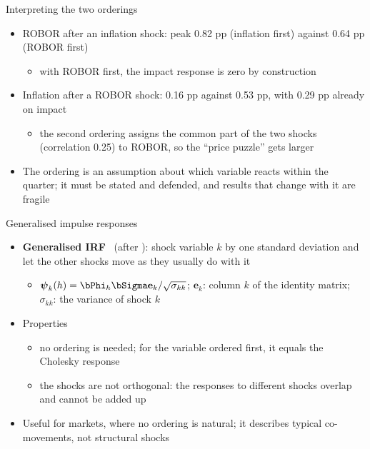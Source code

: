 \begin{frame}{Interpreting the two orderings}
\itemsize{\small}
\begin{itemize}
    \item ROBOR after an inflation shock: peak 0.82 pp (inflation first) against 0.64 pp (ROBOR first)
    \begin{itemize}
        \item with ROBOR first, the impact response is zero by construction
    \end{itemize}
    \item Inflation after a ROBOR shock: 0.16 pp against 0.53 pp, with 0.29 pp already on impact
    \begin{itemize}
        \item the second ordering assigns the common part of the two shocks (correlation 0.25) to ROBOR, so the ``price puzzle'' gets larger
    \end{itemize}
    \item The ordering is an assumption about which variable reacts within the quarter; it must be stated and defended, and results that change with it are fragile
\end{itemize}
\end{frame}

\begin{frame}{Generalised impulse responses}
\itemsize{\small}
\begin{itemize}
    \item \textbf{Generalised IRF} \ (after ): shock variable $k$ by one standard deviation and let the other shocks move as they usually do with it
    \begin{itemize}
        \item $\boldsymbol{\psi}_k(h) = \bPhi_h\bSigma\mathbf{e}_k/\sqrt{\sigma_{kk}}$; $\mathbf{e}_k$: column $k$ of the identity matrix; $\sigma_{kk}$: the variance of shock $k$
    \end{itemize}
    \item Properties
    \begin{itemize}
        \item no ordering is needed; for the variable ordered first, it equals the Cholesky response
        \item the shocks are not orthogonal: the responses to different shocks overlap and cannot be added up
    \end{itemize}
    \item Useful for markets, where no ordering is natural; it describes typical co-movements, not structural shocks
\end{itemize}
\end{frame}

